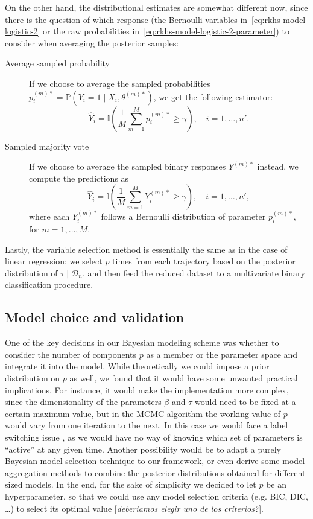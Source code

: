 \documentclass[ba]{imsart}
\numberwithin{equation}{section}
\theoremstyle{plain}
\newcommand\incomment[1]{\color{red}[\textit{#1}]\color{black}}
\begin{document}
On the other hand, the distributional estimates are somewhat different now, since there is the question of which response (the Bernoulli variables in~\eqref{eq:rkhs-model-logistic-2} or the raw probabilities in~\eqref{eq:rkhs-model-logistic-2-parameter}) to consider when averaging the posterior samples:
\begin{description}
  \item[Average sampled probability] If we choose to average the sampled probabilities \(p_i^{(m)*} = \mathbb P(Y_i =1 \mid X_i,\theta^{(m)*})\), we get the following estimator:
  \[
    \hat Y_i = \mathbb I\left(\frac{1}{M} \sum_{m=1}^M p_i^{(m)*} \geq \gamma\right), \quad i=1,\dots,n'.
  \]
  \item[Sampled majority vote] If we choose to average the sampled binary responses \(Y^{(m)*}\) instead, we compute the predictions as
\[
  \hat Y_i = \mathbb I\left(\frac{1}{M} \sum_{m=1}^M Y_i^{(m)*} \geq \gamma\right), \quad i=1,\dots,n',
\]
where each \(Y_i^{(m)*}\) follows a Bernoulli distribution of parameter \(p_i^{(m)*}\), for \(m=1,\dots,M\).
\end{description}

Lastly, the variable selection method is essentially the same as in the case of linear regression: we select \(p\) times from each trajectory based on the posterior distribution of \(\tau\mid \mathcal D_n\), and then feed the reduced dataset to a multivariate binary classification procedure.

\subsection{Model choice and validation}\label{sec:model-choice}

One of the key decisions in our Bayesian modeling scheme was whether to consider the number of components \(p\) as a member or the parameter space and integrate it into the model. While theoretically we could impose a prior distribution on \(p\) as well, we found that it would have some unwanted practical implications. For instance, it would make the implementation more complex, since the dimensionality of the parameters \(\beta\) and \(\tau\) would need to be fixed at a certain maximum value, but in the MCMC algorithm the working value of \(p\) would vary from one iteration to the next. In this case we would face a label switching issue \citep[c.f.][Sec.~2.3]{grollemund2019bayesian}, as we would have no way of knowing which set of parameters is ``active'' at any given time. Another possibility would be to adapt a purely Bayesian model selection technique \citep[see][Ch.~7]{piironen2017comparison, gelman1995bayesian} to our framework, or even derive some model aggregation methods to combine the posterior distributions obtained for different-sized models. In the end, for the sake of simplicity we decided to let \(p\) be an hyperparameter, so that we could use any model selection criteria (e.g. BIC, DIC, \ldots) to select its optimal value \incomment{deberíamos elegir uno de los criterios?}.
\end{document}
